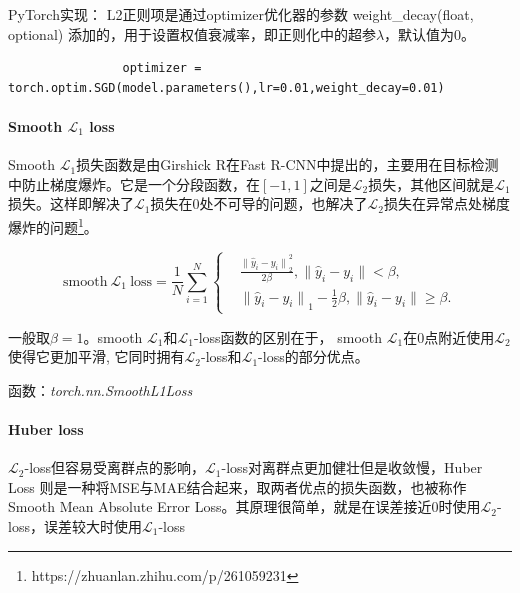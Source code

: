 \documentclass[letterpaper,12pt]{article}
\begin{document}
			PyTorch实现： L2正则项是通过optimizer优化器的参数 weight\_decay(float, optional) 添加的，用于设置权值衰减率，即正则化中的超参$\lambda$，默认值为0。
			
			\lstset{language=python,breaklines=true}
			\begin{lstlisting}
				optimizer = torch.optim.SGD(model.parameters(),lr=0.01,weight_decay=0.01)
			\end{lstlisting}

			\paragraph{Smooth $\mathcal{L}_1$ loss}
	
			Smooth $\mathcal{L}_1$损失函数是由Girshick R在Fast R-CNN中提出的，主要用在目标检测中防止梯度爆炸。它是一个分段函数，在$\left[-1,1\right]$之间是$\mathcal{L}_2$损失，其他区间就是$\mathcal{L}_1$损失。这样即解决了$\mathcal{L}_1$损失在0处不可导的问题，也解决了$\mathcal{L}_2$损失在异常点处梯度爆炸的问题\footnote{https://zhuanlan.zhihu.com/p/261059231}。
			
			\begin{equation}
				\text{smooth} \ \mathcal{L}_1 \ \text{loss} = \frac{1}{N}\sum_{i=1}^{N}
				\left\{
				\begin{aligned}
					&\frac{{\|\hat{y}_i - y_i \|}_2^{2}}{2\beta}, \| \hat{y}_i -y_i \| < \beta , \\
					&{\|\hat{y}_i - y_i \|}_1 - \frac{1}{2}\beta, \| \hat{y}_i -y_i \| \geq \beta.
				\end{aligned}
				\right.
			\end{equation}		
	
			一般取$\beta=1$。smooth $\mathcal{L}_1$和$\mathcal{L}_1$-loss函数的区别在于， smooth $\mathcal{L}_1$在0点附近使用$\mathcal{L}_2$使得它更加平滑, 它同时拥有$\mathcal{L}_2$-loss和$\mathcal{L}_1$-loss的部分优点。
	
			函数：\textit{torch.nn.SmoothL1Loss}
			
			\paragraph{Huber loss}
			
			$\mathcal{L}_2$-loss但容易受离群点的影响，$\mathcal{L}_1$-loss对离群点更加健壮但是收敛慢，Huber Loss 则是一种将MSE与MAE结合起来，取两者优点的损失函数，也被称作Smooth Mean Absolute Error Loss。其原理很简单，就是在误差接近0时使用$\mathcal{L}_2$-loss，误差较大时使用$\mathcal{L}_1$-loss
			
\end{document}
